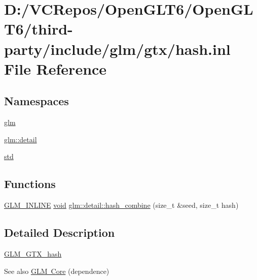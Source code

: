 \hypertarget{hash_8inl}{}\section{D\+:/\+V\+C\+Repos/\+Open\+G\+L\+T6/\+Open\+G\+L\+T6/third-\/party/include/glm/gtx/hash.inl File Reference}
\label{hash_8inl}
\subsection*{Namespaces}
\begin{DoxyCompactItemize}
\item 
 \mbox{\hyperlink{namespaceglm}{glm}}
\item 
 \mbox{\hyperlink{namespaceglm_1_1detail}{glm\+::detail}}
\item 
 \mbox{\hyperlink{namespacestd}{std}}
\end{DoxyCompactItemize}
\subsection*{Functions}
\begin{DoxyCompactItemize}
\item 
\mbox{\hyperlink{setup_8hpp_a4603970cbd724c5d102bbcf17f430047}{G\+L\+M\+\_\+\+I\+N\+L\+I\+NE}} \mbox{\hyperlink{glad_8h_a950fc91edb4504f62f1c577bf4727c29}{void}} \mbox{\hyperlink{namespaceglm_1_1detail_a391b3eb8d7f4662a1b31046bd69f2755}{glm\+::detail\+::hash\+\_\+combine}} (size\+\_\+t \&seed, size\+\_\+t hash)
\end{DoxyCompactItemize}


\subsection{Detailed Description}
\mbox{\hyperlink{group__gtx__hash}{G\+L\+M\+\_\+\+G\+T\+X\+\_\+hash}}

\begin{DoxySeeAlso}{See also}
\mbox{\hyperlink{group__core}{G\+L\+M Core}} (dependence) 
\end{DoxySeeAlso}
